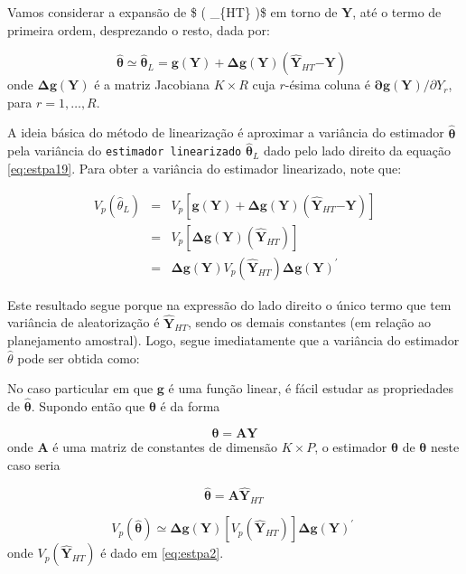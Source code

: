 \documentclass[
  12pt,
  brazilian,
]{book}
\theoremstyle{definition}
\theoremstyle{definition}
\theoremstyle{definition}
\theoremstyle{definition}
\theoremstyle{remark}
\begin{document}
Vamos considerar a expansão de \$  \left( \_\{HT\} \right)\$ em torno de \(\mathbf{Y}\), até o termo de primeira ordem, desprezando o resto, dada por:

\[
\mathbf{\widehat{\theta} \simeq \widehat{\theta}}_{L} = \mathbf{g(Y) + \Delta g(Y)} \left( \mathbf{\widehat{Y}}_{HT} \mathbf{-Y} \right) \,\,\, \label{eq:estpa19}
\]
onde \(\mathbf{\Delta g(Y)}\) é a matriz Jacobiana \(K \times R\) cuja \(r\)-ésima coluna é \(\mathbf{\partial g(Y)/}\partial Y_{r}\), para \(r=1,\ldots, R\).

A ideia básica do método de linearização é aproximar a variância do estimador \(\mathbf{\widehat{\theta}}\) pela variância do \texttt{estimador\ linearizado} \(\mathbf{\widehat{\theta}}_L\) dado pelo lado direito da equação \eqref{eq:estpa19}. Para obter a variância do estimador linearizado, note que:

\[
\begin{array}{lll}
 V_p \left( \widehat{\theta}_L \right) & = & V_p \left[ \mathbf{g(Y) + \Delta g(Y)} \left( \mathbf{\widehat{Y}}_{HT} \mathbf{-Y} \right) \right] \\
 & = & V_p \left[ \mathbf{\Delta g(Y)} \left( \mathbf{\widehat{Y}}_{HT} \right) \right] \\
 & = & \mathbf{\Delta g(Y)} V_p \left( \mathbf{\widehat{Y}}_{HT} \right)  \mathbf{\Delta g(Y)}^{\prime} 
\end{array}
\]

Este resultado segue porque na expressão do lado direito o único termo que tem variância de aleatorização é \(\mathbf{\widehat{Y}}_{HT}\), sendo os demais constantes (em relação ao planejamento amostral). Logo, segue imediatamente que a variância do estimador \(\widehat{\theta}\) pode ser obtida como:

No caso particular em que \(\mathbf{g}\) é uma função linear, é fácil estudar as propriedades de \(\mathbf{\widehat{\theta}}\). Supondo então que \(\mathbf{\theta}\) é da forma

\[
\mathbf{\theta} = \mathbf{AY}  
\]
onde \(\mathbf{A}\) é uma matriz de constantes de dimensão \(K \times P\), o estimador
\(\mathbf{\widehat{\theta}}\) de \(\mathbf{\theta}\) neste caso seria

\[
\mathbf{\widehat{\theta}} = \mathbf{A \widehat{Y}}_{HT} \,
\]

\[
V_{p} \left( \mathbf{\widehat{\theta}} \right) \mathbf{\simeq \Delta g(Y)} \left[
V_{p} \left( \mathbf{\hat{Y}}_{HT} \right) \right] \mathbf{\Delta g(Y)}^{\prime}
\,\, \label{eq:estpa20}
\]
onde \(V_{p} \left( \mathbf{\widehat{Y}}_{HT}\right)\) é dado em \eqref{eq:estpa2}.
\end{document}
